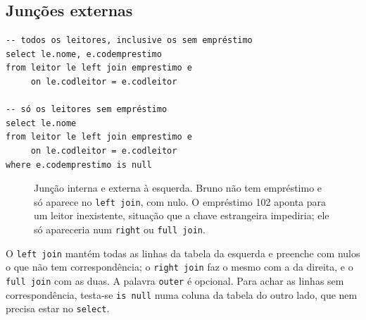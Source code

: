 \subsection{Junções externas}

\begin{lstlisting}
-- todos os leitores, inclusive os sem empréstimo
select le.nome, e.codemprestimo
from leitor le left join emprestimo e
     on le.codleitor = e.codleitor

-- só os leitores sem empréstimo
select le.nome
from leitor le left join emprestimo e
     on le.codleitor = e.codleitor
where e.codemprestimo is null
\end{lstlisting}

\begin{figure}[h]
\centering
{}
\caption{Junção interna e externa à esquerda. Bruno não tem empréstimo e
só aparece no \texttt{left join}, com nulo. O empréstimo 102 aponta para
um leitor inexistente, situação que a chave estrangeira impediria; ele só
apareceria num \texttt{right} ou \texttt{full join}.}
\end{figure}

O \texttt{left join} mantém todas as linhas da tabela da esquerda e
preenche com nulos o que não tem correspondência; o \texttt{right join}
faz o mesmo com a da direita, e o \texttt{full join} com as duas. A
palavra \texttt{outer} é opcional. Para achar as linhas sem
correspondência, testa-se \texttt{is null} numa coluna da tabela do
outro lado, que nem precisa estar no \texttt{select}.

